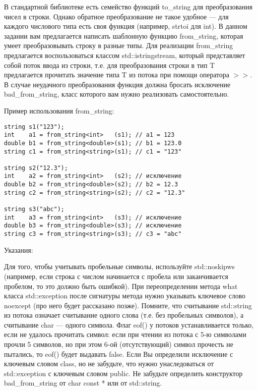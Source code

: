 \documentclass[]{article}
\begin{document}
В стандартной библиотеке есть семейство функций to\_string для преобразования чисел в строки. Однако обратное преобразование не такое удобное — для каждого числового типа есть своя функция (например, strtoi для int).
В данном задании вам предлагается написать шаблонную функцию from\_string, которая умеет преобразовывать строку в разные типы. Для реализации from\_string предлагается воспользоваться классом std::istringstream, который представляет собой поток ввода из строки, т.е. для преобразования строки в тип T предлагается прочитать значение типа T из потока при помощи оператора $>>$. В случае неудачного преобразования функция должна бросать исключение bad\_from\_string, класс которого вам нужно реализовать самостоятельно.

Пример использования from\_string:
\begin{verbatim}
string s1("123");
int    a1 = from_string<int>   (s1); // a1 = 123
double b1 = from_string<double>(s1); // b1 = 123.0
string c1 = from_string<string>(s1); // c1 = "123"

string s2("12.3");
int    a2 = from_string<int>   (s2); // исключение
double b2 = from_string<double>(s2); // b2 = 12.3
string c2 = from_string<string>(s2); // c2 = "12.3"

string s3("abc");
int    a3 = from_string<int>   (s3); // исключение
double b3 = from_string<double>(s3); // исключение
string c3 = from_string<string>(s3); // c3 = "abc"
\end{verbatim}

Указания:

    Для того, чтобы учитывать пробельные символы, используйте std::noskipws (например, если строка с числом начинается с пробела или заканчивается пробелом, то это должно быть ошибкой).
    При переопределении метода what класса std::exception после сигнатуры метода нужно указывать ключевое слово noexcept (про него будет рассказано позже).
    Помните, что считывание std::string из потока означает считывание одного слова (т.е. без пробельных символов), а считывание char — одного символа.
    Флаг eof() у потоков устанавливается только, если не удалось прочитать символ: если при чтении из потока с 5-ю символами прочли 5 символов, но при этом 6-ой (отсутствующий) символ прочесть не пытались, то eof() будет выдавать false.
    Если Вы определили исключение с ключевым словом class, но не забудьте, что нужно унаследоваться от std::exception с ключевым словом public.
    Не забудьте определить конструктор bad\_from\_string от char const * или от std::string.
\end{document}
